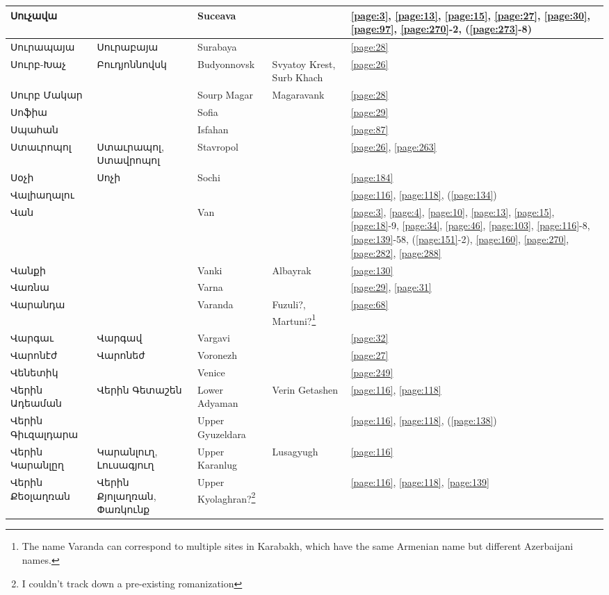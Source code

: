 \begin{center}
\begin{longtable}{|p{}|p{3cm}|p{3cm}|p{2cm}|p{3cm}|}
Սուչավա& &
Suceava& &\ref{page:3}, \ref{page:13}, \ref{page:15}, \ref{page:27}, \ref{page:30}, \ref{page:97}, \ref{page:270}-2, (\ref{page:273}-8)\\ \hline
Սուրապայա&Սուրաբայա &Surabaya & &\ref{page:28}\\ \hline
Սուրբ-Խաչ& Բուդյոննովսկ& Budyonnovsk&Svyatoy Krest, Surb Khach &\ref{page:26}\\ \hline
Սուրբ Մակար& & Sourp Magar&Magaravank &\ref{page:28}\\ \hline
Սոֆիա& &Sofia & &\ref{page:29}\\ \hline
Սպահան& &Isfahan & &\ref{page:87}\\ \hline
Ստաւրոպոլ& Ստաւրապոլ, Ստավրոպոլ& Stavropol& &\ref{page:26}, \ref{page:263}\\ \hline
Սօչի& Սոչի& Sochi& &\ref{page:184}\\ \hline
Վալիաղալու& & & &\ref{page:116}, \ref{page:118}, (\ref{page:134})\\ \hline
Վան& &Van & &\ref{page:3}, \ref{page:4}, \ref{page:10}, \ref{page:13}, \ref{page:15}, \ref{page:18}-9, \ref{page:34}, \ref{page:46}, \ref{page:103}, \ref{page:116}-8, \ref{page:139}-58, (\ref{page:151}-2), \ref{page:160}, \ref{page:270}, \ref{page:282}, \ref{page:288}\\ \hline
	Վանքի& & Vanki&Albayrak &\ref{page:130}\\ \hline
	Վառնա& &Varna & &\ref{page:29}, \ref{page:31}\\ \hline
	Վարանդա& &Varanda & Fuzuli?, Martuni?\footnote{The name Varanda can correspond to multiple sites in Karabakh, which have the same Armenian name but different Azerbaijani names. }&\ref{page:68}\\ \hline
	Վարգաւ& Վարգավ& Vargavi  & &\ref{page:32}\\ \hline
	Վարոնէժ&Վարոնեժ & Voronezh& &\ref{page:27}\\ \hline
	Վենետիկ& & Venice& &\ref{page:249}\\ \hline
	Վերին Ադեաման& Վերին Գետաշեն& Lower Adyaman&  Verin Getashen&\ref{page:116}, \ref{page:118}\\ \hline
	Վերին Գիւզալդարա& &Upper Gyuzeldara   & &\ref{page:116}, \ref{page:118}, (\ref{page:138})\\ \hline
	Վերին Կարանլըղ&Կարանլուղ, Լուսագյուղ   & Upper Karanlug &  Lusagyugh &\ref{page:116}\\ \hline
	Վերին Քեօլաղռան&Վերին Քյոլաղռան, Փառկունք & Upper Kyolaghran?\footnote{I couldn't track down a pre-existing romanization}& &\ref{page:116}, \ref{page:118}, \ref{page:139}\\ \hline

\end{longtable}
\end{center}
